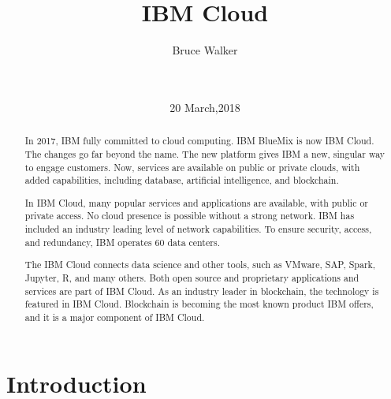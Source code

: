 
\title{IBM Cloud}

\author{
\alignauthor
Bruce Walker\\
       \\
       \\
} 
\date{20 March,2018}


\maketitle
\begin{abstract}

In 2017, IBM fully committed to cloud computing. IBM BlueMix
is now IBM Cloud. The changes go far beyond the name. The new 
platform gives IBM a new, singular way to engage customers. Now, services are available on public or 
private clouds, with added capabilities, including database, 
artificial intelligence, and blockchain.

In IBM Cloud, many popular services and applications are 
available, with public or private access. No cloud presence 
is possible without a strong network. IBM has included an 
industry leading level of network capabilities. To ensure 
security, access, and redundancy, IBM operates 60 data centers.

The IBM Cloud connects data science and other tools, such as 
VMware, SAP, Spark, Jupyter, R, and many others. Both open source and proprietary 
applications and services are part of IBM Cloud.
As an industry leader in blockchain, the 
technology is featured in IBM Cloud. Blockchain is becoming 
the most known product IBM offers, and it is a major component
of IBM Cloud. 
\end{abstract}




\section{Introduction}

